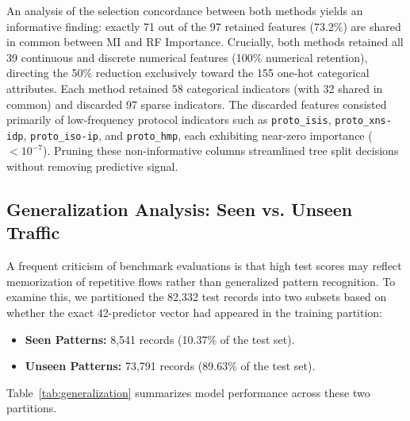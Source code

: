 \documentclass[conference]{IEEEtran}
\begin{document}
An analysis of the selection concordance between both methods yields an informative finding: exactly 71 out of the 97 retained features (73.2\%) are shared in common between MI and RF Importance. Crucially, both methods retained all 39 continuous and discrete numerical features (100\% numerical retention), directing the 50\% reduction exclusively toward the 155 one-hot categorical attributes. Each method retained 58 categorical indicators (with 32 shared in common) and discarded 97 sparse indicators. The discarded features consisted primarily of low-frequency protocol indicators such as \texttt{proto\_isis}, \texttt{proto\_xns-idp}, \texttt{proto\_iso-ip}, and \texttt{proto\_hmp}, each exhibiting near-zero importance ($< 10^{-7}$). Pruning these non-informative columns streamlined tree split decisions without removing predictive signal.

\subsection{Generalization Analysis: Seen vs. Unseen Traffic}
A frequent criticism of benchmark evaluations is that high test scores may reflect memorization of repetitive flows rather than generalized pattern recognition. To examine this, we partitioned the 82,332 test records into two subsets based on whether the exact 42-predictor vector had appeared in the training partition:
\begin{itemize}
    \item \textbf{Seen Patterns:} 8,541 records (10.37\% of the test set).
    \item \textbf{Unseen Patterns:} 73,791 records (89.63\% of the test set).
\end{itemize}

Table~\ref{tab:generalization} summarizes model performance across these two partitions.

\begin{table}[htbp]
\caption{Model Generalization on Seen vs. Unseen Traffic Patterns}
\begin{center}
\end{center}
\label{tab:generalization}
\end{table}
\end{document}
